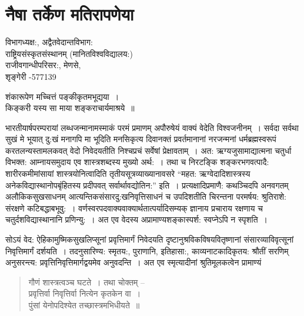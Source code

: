 {\fontsize{15}{17}\selectfont
\chapter{नैषा तर्केण मतिरापणेया}

\begin{center}
\smallskip

विभागध्यक्ष:, अद्वैतवेदान्तविभाग:\\
राष्ट्रियसंस्कृतसंस्थानम् (मानितविश्वविद्यालय:)\\
राजीवगान्धीपरिसर:, मेणसे,\\ 
शृङ्गेरी -577139
\addrule
\end{center}

\begin{center}
शंकारूपेण मच्चित्तं पङ्कीकृतमभूद्यया~। \\
किङ्करी यस्य सा माया शङ्कराचार्यमाश्रये~॥
\end{center}

भारतीयार्षपरम्परायां लब्धजन्मानामस्माकं परमं प्रमाणम् अपौरुषेयं वाक्यं वेदेति विश्वजनीनम्~। सर्वदा सर्वथा सुखं मे भूयात् दु:खं मनागपि मा  भूदिति मनसिकृत्य दिवानक्तं प्रवर्तमानानां नरजन्मनां धर्मब्रह्मस्वरूपं करतलन्यस्तामलकवत् वेदो निवेदयतीति निश्चप्रचं सर्वेषां प्रेक्षावताम्~। अत: ऋग्यजुसामाद्यात्मना चतुर्धा विभक्त: आम्नायसमुदाय एव शास्त्रशब्दस्य मुख्यो अर्थ:~। तथा च निरटङ्कि शङ्करभगवत्पादै: शारीरकमीमांसायां शास्त्रयोनित्वादिति तृतीयसूत्रव्याख्यानावसरे “महत: ऋग्वेदादिशास्त्रस्य अनेकविद्यास्थानोपबृंहितस्य प्रदीपवत् सर्वार्थावद्योतिन:” इति~। प्रत्यक्षादिप्रमाणै: कथञ्चिदपि अनवगतम् अलौकिकसुखसाधनम् आत्यन्तिकसंसारदु:खनिवृत्तिसाधनं च उपदिशतीति चिरन्तना परमर्षय: श्रुतिराशे: संरक्षणे कटिबद्धाबभूवु:~। वर्णस्वरपदवाक्यवाक्यार्थतात्पर्यादिसम्यक् ज्ञानाय प्रचाराय रक्षणाय च चतुर्दशविद्यास्थानानि प्रणिन्यु:~। अत एव वेदस्य अप्रामाण्यशङ्कास्पर्श: स्वप्नेऽपि न स्पृशति~। 

सोऽयं वेद: ऐहिकामुष्मिकसुखलिप्सूनां प्रवृत्तिमार्गं निवेदयति दृष्टानुश्रविकविषयवितृष्णानां संसारव्याविवृत्सूनां निवृत्तिमार्गं दर्शयति~। तदनुसारिण्य: स्मृतय:, पुराणानि, इतिहासा:, काव्यनाटकादिकृतय: श्रौतीं सरणिम् अनुसरन्त्य: प्रवृत्तिनिवृत्तिमार्गद्वयमेव अनुवदन्ति~। अत एव स्मृत्यादीनां श्रुतिमूलकत्वेन प्रामाण्यं
\begin{verse}
गौणं शास्त्रत्वञ्च घटते~। तथा चोक्तम् –\\
प्रवृत्तिर्वा निवृत्तिर्वा नित्येन कृतकेन वा~। \\
पुंसां येनोपदिश्येत तच्छास्त्रमभिधीयते~॥
\end{verse}

}
